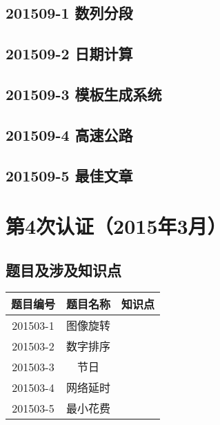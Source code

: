 \documentclass[cn,10pt,math=newtx,citestyle=gb7714-2015,bibstyle=gb7714-2015]{elegantbook}
\newif\ifonlyanalyze %
\begin{document}
\newpage
\section{201509-1 数列分段}
\ifonlyanalyze
\else
    
\fi


\newpage
\section{201509-2 日期计算}
\ifonlyanalyze
\else
    
\fi


\newpage
\section{201509-3 模板生成系统}
\ifonlyanalyze
\else
    
\fi


\newpage
\section{201509-4 高速公路}
\ifonlyanalyze
\else
    
\fi


\newpage
\section{201509-5 最佳文章}
\ifonlyanalyze
\else
    
\fi



\chapter{第4次认证（2015年3月）}

\section{题目及涉及知识点}

\begin{table}[htbp]
    \centering
    \begin{tabular}{ccc}
        \toprule
        题目编号 & 题目名称 & 知识点 \\
        \midrule
        201503-1 & 图像旋转 &        \\
        201503-2 & 数字排序 &        \\
        201503-3 & 节日     &        \\
        201503-4 & 网络延时 &        \\
        201503-5 & 最小花费 &        \\
        \bottomrule
    \end{tabular}
\end{table}
\end{document}
